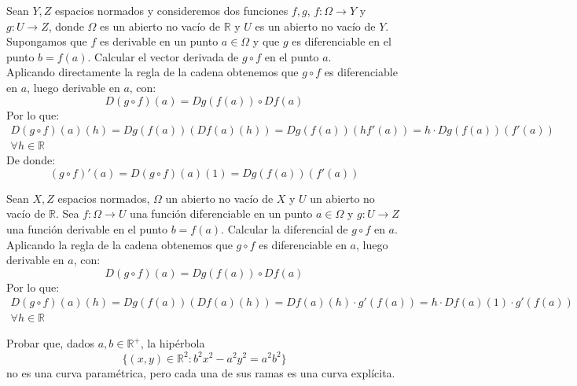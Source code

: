 \begin{ejercicio}
Sean \( Y,Z \) espacios normados y consideremos dos funciones $f,g$, \( f: \Omega \rightarrow Y \) y \( g : U \rightarrow Z \), donde \( \Omega \) es un abierto no vacío de \( \mathbb{R} \) y \( U \) es un abierto no vacío de \( Y \). Supongamos que \( f \) es derivable en un punto \( a \in \Omega \) y que \( g \) es diferenciable en el punto \( b = f(a) \). Calcular el vector derivada de \( g \circ f \) en el punto \( a \).\\

\noindent
Aplicando directamente la regla de la cadena obtenemos que $g\circ f$ es diferenciable en $a$, luego derivable en $a$, con:
\begin{equation*}
    D(g\circ f)(a) = Dg(f(a)) \circ Df(a)
\end{equation*}
Por lo que:
\begin{multline*}
    D(g\circ f)(a)(h) = Dg(f(a))(Df(a)(h)) = Dg(f(a))(hf'(a)) = h\cdot Dg(f(a))(f'(a)) \\ \forall h\in \mathbb{R}
\end{multline*}
De donde:
\begin{equation*}
    (g\circ f)'(a) = D(g\circ f)(a)(1) = Dg(f(a))(f'(a))
\end{equation*}
\end{ejercicio}

\begin{ejercicio}
Sean \( X,Z \) espacios normados, \( \Omega \) un abierto no vacío de \( X \) y \( U \) un abierto no vacío de \( \mathbb{R} \). Sea \( f : \Omega \rightarrow U \) una función diferenciable en un punto \( a \in \Omega \) y \( g : U \rightarrow Z \) una función derivable en el punto \( b = f(a) \). Calcular la diferencial de \( g \circ f \) en \( a \).\\ 

\noindent
Aplicando la regla de la cadena obtenemos que $g\circ f$ es diferenciable en $a$, luego derivable en $a$, con:
\begin{equation*}
    D(g\circ f)(a) = Dg(f(a)) \circ Df(a)
\end{equation*}
Por lo que:
\begin{multline*}
    D(g\circ f)(a)(h) = Dg(f(a))(Df(a)(h)) = Df(a)(h)\cdot g'(f(a)) = h\cdot Df(a)(1)\cdot g'(f(a))\\ \forall h\in \mathbb{R}
\end{multline*}
\end{ejercicio}

\begin{ejercicio}
Probar que, dados \( a,b \in \mathbb{R}^+ \), la hipérbola \[ \{(x,y) \in \mathbb{R}^2 : b^2x^2 - a^2y^2 = a^2b^2\} \] no es una curva paramétrica, pero cada una de sus ramas es una curva explícita.
\end{ejercicio}

